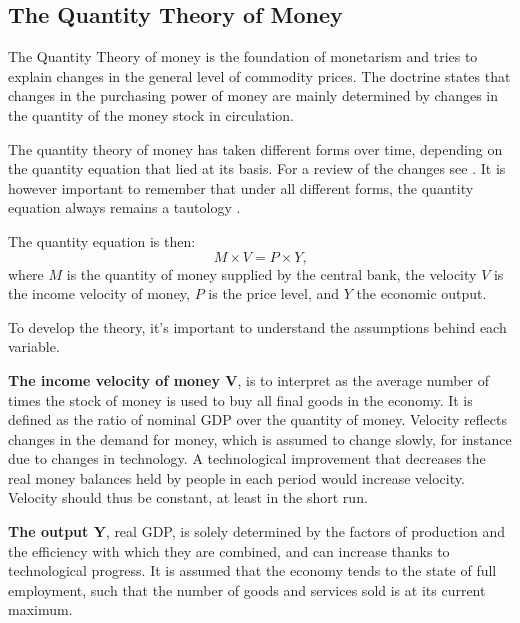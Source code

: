 \documentclass[11pt,a4paper,oneside]{book}
\begin{document}
\subsection{The Quantity Theory of Money}
\label{sec:quantity_theory}

The Quantity Theory of money is the foundation of monetarism and tries to explain changes in the general level of commodity prices. The doctrine states that changes in the purchasing power of money are mainly determined by changes in the quantity of the money stock in circulation.

The quantity theory of money has taken different forms over time, depending on the quantity equation that lied at its basis. For a review of the changes see \citet*{Friedman_1970}.
It is however important to remember that under all different forms, the quantity equation always remains a tautology \citep*[p. 195]{Friedman_1970}.

The quantity equation is then:
\begin{equation}
\label{eq:QTM}
  M \times V = P  \times Y\text{,}
\end{equation}
where $M$ is the quantity of money supplied by the central bank, the velocity $V$ is the income velocity of money, $P$ is the price level, and $Y$ the economic output.

To develop the theory, it's important to understand the assumptions behind each variable.

\textbf{The income velocity of money V}, is to interpret as the average number of times the stock of money is used to buy all final goods in the economy. It is defined as the ratio of nominal GDP over the quantity of money. Velocity reflects changes in the demand for money, which is assumed to change slowly, for instance due to changes in technology. A technological improvement that decreases the real money balances held by people in each period would increase velocity. Velocity should thus be constant, at least in the short run.

\textbf{The output Y}, real GDP, is solely determined by the factors of production and the efficiency with which they are combined, and can increase thanks to technological progress. It is assumed that the economy tends to the state of full employment, such that the number of goods and services sold is at its current maximum.
\end{document}
